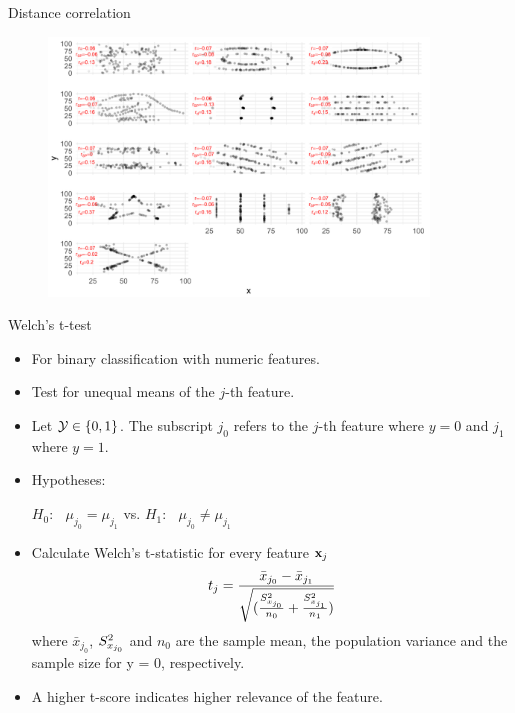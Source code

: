 \documentclass[11pt,compress,t,notes=noshow, xcolor=table]{beamer}
\begin{document}
\begin{vbframe}{Distance correlation}
  \begin{figure}
  \includegraphics[width = 0.9\textwidth]{figure_man/distance-corre.png}
  \end{figure}


  \end{vbframe}




  \begin{vbframe}{Welch's \MakeLowercase{t}-test}
  \begin{itemize}
    \item For binary classification with numeric features.
    \item Test for unequal means of the $j$-th feature.
    \item Let $\mathcal{Y} \in \{ 0, 1\}$. The subscript $j_0$ refers to the $j$-th feature where $y = 0$ and $j_1$ where $y = 1$.
    \item Hypotheses:

    $H_0$: $\;\;\mu_{j_0} = \mu_{j_1} $ \qquad vs. \qquad $H_1$: $\;\;\mu_{j_0} \neq \mu_{j_1}$

    \item Calculate Welch's t-statistic for every feature $\mathbf{x}_j$
    $$ t_j = \frac{\bar{x}_{j_0} - \bar{x}_{j_1}}{\sqrt{(\frac{S^2_{x_{j_0}}}{n_0} + \frac{S^2_{x_{j_1}}}{n_1})}}$$
    where $\bar{x}_{j_0}$, $S^2_{x_{j_0}}$ and $n_0$ are the sample mean, the population variance and the sample size for y = 0, respectively.
    \item A higher t-score indicates higher relevance of the feature.
  \end{itemize}
  \end{vbframe}
\end{document}
